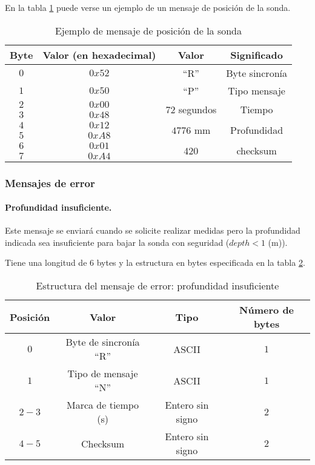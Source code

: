 En la tabla \ref{tab15} puede verse un ejemplo de un mensaje de posición de la sonda.

\begin{table}[h]
	\centering
	\caption{Ejemplo de mensaje de posición de la sonda}
	\begin{tabular}{|c|c|c|c|}\hline
		\textbf{Byte} 	&	\textbf{Valor (en hexadecimal)}	&\textbf{Valor}	&\textbf{Significado} \\ \hline \hline
		$0$ 			&  $0x52$			& ``R''	& Byte sincronía	\\ \hline
		$1$				&  $0x50$			& ``P''		& Tipo mensaje		\\ \hline
		$2$				&  $0x00$			& \multirow{2}{*}{$72$ segundos} & \multirow{2}{*}{Tiempo} \\
		$3$				&  $0x48$			&  & \\ \hline	
		$4$				&  $0x12$			& \multirow{2}{*}{$4776$ mm} & \multirow{2}{*}{Profundidad} \\
		$5$				&  $0xA8$			&  & \\ \hline	
		$6$				&  $0x01$			&  \multirow{2}{*}{420}	& \multirow{2}{*}{checksum} \\
		$7$				&  $0xA4$			&     &     \\ \hline	
		
		
	\end{tabular}
	\label{tab15}
\end{table}

\subsubsection{Mensajes de error}
\paragraph{Profundidad insuficiente.} Este mensaje se enviará cuando se solicite realizar medidas pero la profundidad indicada sea insuficiente para bajar la sonda con seguridad ($depth<1$ (m)). 

Tiene una longitud de $6$ bytes y la estructura en bytes especificada en la tabla \ref{tab16}.

\begin{table}[h]
	\centering
	\caption{Estructura del mensaje de error: profundidad insuficiente}
	\begin{tabular}{|c|c|c|c|}\hline 
		\textbf{Posición}	& \textbf{Valor} & \textbf{Tipo} &\textbf{Número de bytes} \\ \hline \hline 
		$0$		& Byte de sincronía ``R''				& ASCII	 			&	$1$ \\  \hline
		$1$		& Tipo de mensaje ``N''					& ASCII	 			&	$1$ \\  \hline
		$2-3$	& Marca de tiempo (s)					& Entero sin signo	&   $2$ \\  \hline
		$4-5$	& Checksum 				  				& Entero sin signo	&   $2$ \\  \hline
	\end{tabular}
	\label{tab16}
\end{table}

